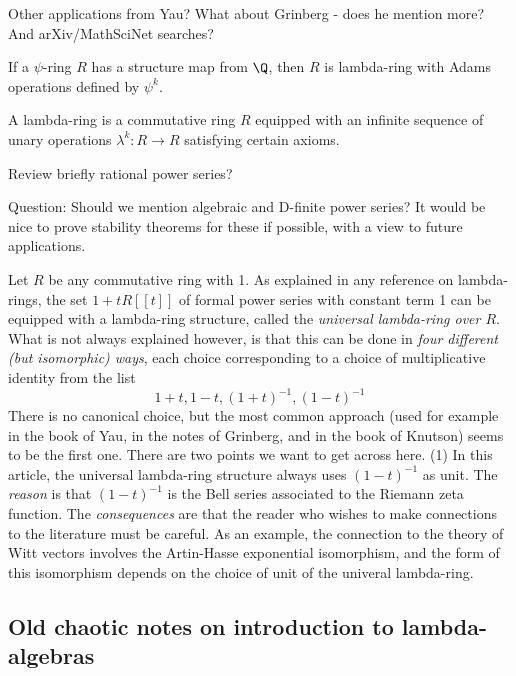 \documentclass[a4paper]{article}
\begin{document}
\begin{example}
Other applications from Yau? What about Grinberg - does he mention more? And arXiv/MathSciNet searches?
\end{example}




\begin{lemma}
If a $\psi$-ring $R$ has a structure map from $\Q$, then $R$ is lambda-ring with Adams operations defined by $\psi^k$.
\end{lemma}


A lambda-ring is a commutative ring $R$ equipped with an infinite sequence of unary operations $\lambda^k: R \to R$ satisfying certain axioms. 




Review briefly rational power series?

Question: Should we mention algebraic and D-finite power series? It would be nice to prove stability theorems for these if possible, with a view to future applications.

\begin{remark}
Let $R$ be any commutative ring with 1. As explained in any reference on lambda-rings, the set $1 + t R[[t]]$ of formal power series with constant term 1 can be equipped with a lambda-ring structure, called the \emph{universal lambda-ring over $R$}. What is not always explained however, is that this can be done in \emph{four different (but isomorphic) ways}, each choice corresponding to a choice of multiplicative identity from the list
$$ 1+t, 1-t, (1+t)^{-1}, (1-t)^{-1} $$
There is no canonical choice, but the most common approach (used for example in the book of Yau, in the notes of Grinberg, and in the book of Knutson) seems to be the first one. There are two points we want to get across here. (1) In this article, the universal lambda-ring structure always uses $(1-t)^{-1}$ as unit. The \emph{reason} is that $(1-t)^{-1}$ is the Bell series associated to the Riemann zeta function. The \emph{consequences} are that the reader who wishes to make connections to the literature must be careful. As an example, the connection to the theory of Witt vectors involves the Artin-Hasse exponential isomorphism, and the form of this isomorphism depends on the choice of unit of the univeral lambda-ring.
\end{remark}



\subsection{Old chaotic notes on introduction to lambda-algebras}
\end{document}
